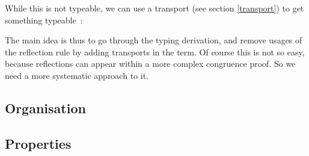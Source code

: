 \begin{center}\begin{prooftree}
\end{prooftree}\end{center}

While this is not typeable, we can use a transport (see section \ref{transport})
to get something typeable~:

\begin{center}\begin{prooftree}
\end{prooftree}\end{center}

The main idea is thus to go through the typing derivation, and remove usages of
the reflection rule by adding transports in the term. Of course this is not so
easy, because reflections can appear within a more complex congruence proof. So
we need a more systematic approach to it.

\subsection{Organisation}

\subsection{Properties}

